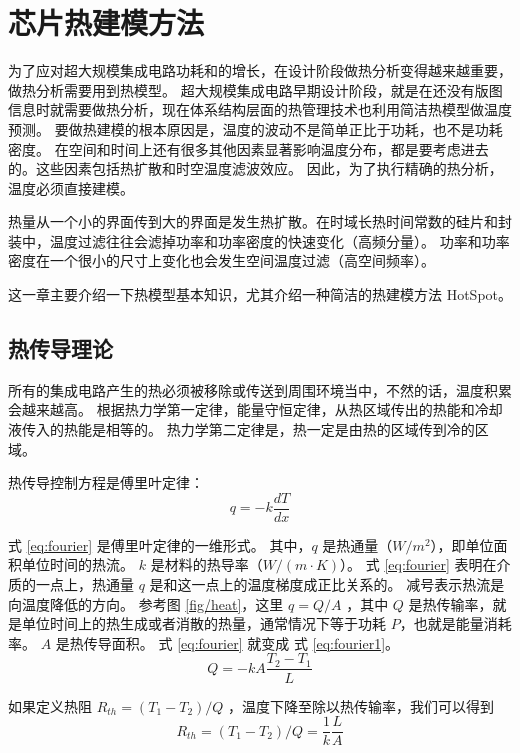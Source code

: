 
\chapter{芯片热建模方法}

为了应对超大规模集成电路功耗和的增长，在设计阶段做热分析变得越来越重要，做热分析需要用到热模型。
超大规模集成电路早期设计阶段，就是在还没有版图信息时就需要做热分析，现在体系结构层面的热管理技术也利用简洁热模型做温度预测。
要做热建模的根本原因是，温度的波动不是简单正比于功耗，也不是功耗密度。
在空间和时间上还有很多其他因素显著影响温度分布，都是要考虑进去的。这些因素包括热扩散和时空温度滤波效应。
因此，为了执行精确的热分析，温度必须直接建模。

热量从一个小的界面传到大的界面是发生热扩散。在时域长热时间常数的硅片和封装中，温度过滤往往会滤掉功率和功率密度的快速变化（高频分量）。
功率和功率密度在一个很小的尺寸上变化也会发生空间温度过滤（高空间频率）。

这一章主要介绍一下热模型基本知识，尤其介绍一种简洁的热建模方法 HotSpot。

\section{热传导理论}\label{sec:thermal}
所有的集成电路产生的热必须被移除或传送到周围环境当中，不然的话，温度积累会越来越高。
根据热力学第一定律，能量守恒定律，从热区域传出的热能和冷却液传入的热能是相等的。
热力学第二定律是，热一定是由热的区域传到冷的区域。

热传导控制方程是傅里叶定律：
\begin{equation}\label{eq:fourier}
q = -k\frac{dT}{dx}
\end{equation}

式 \eqref{eq:fourier} 是傅里叶定律的一维形式。
其中，$ q $ 是热通量（$W/m^2$），即单位面积单位时间的热流。 $k $ 是材料的热导率（$W/(m \cdot K)$）。
式 \eqref{eq:fourier} 表明在介质的一点上，热通量 $q$ 是和这一点上的温度梯度成正比关系的。
减号表示热流是向温度降低的方向。
参考图 \ref{fig/heat}，这里 $q = Q/A $ ，其中 $Q$ 是热传输率，就是单位时间上的热生成或者消散的热量，通常情况下等于功耗 $P$，也就是能量消耗率。 
$A$ 是热传导面积。 式 \eqref{eq:fourier} 就变成 式 \eqref{eq:fourier1}。
\begin{equation}\label{eq:fourier1}
Q = -kA\frac{T_2-T_1}{L}
\end{equation}

如果定义热阻 $R_{th} = (T_1 -T_2)/Q$ ，温度下降至除以热传输率，我们可以得到
\begin{equation}\label{eq:Rth}
R_{th} = (T_1-T_2)/Q = \frac{1}{k}\frac{L}{A}
\end{equation}

